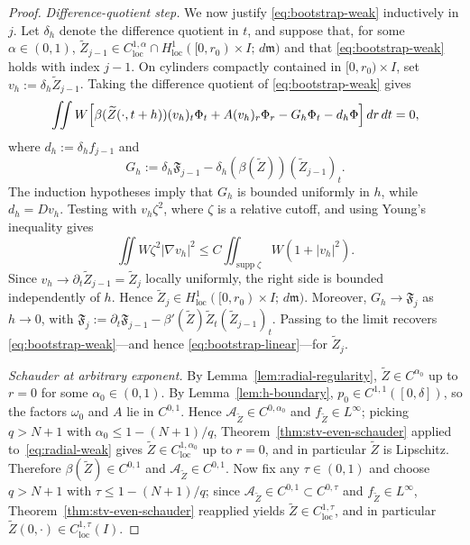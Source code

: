 \documentclass[11pt]{amsart}
\newcommand{\dd}{\,d}
\newcommand{\loc}{\mathrm{loc}}
\begin{document}
\begin{proof}
\emph{Difference-quotient step.} We now justify \eqref{eq:bootstrap-weak}
inductively in \(j\). Let \(\delta_h\) denote the difference quotient in
\(t\), and suppose that, for some \(\alpha\in(0,1)\),
\(\widetilde Z_{j-1}\in C^{1,\alpha}_{\loc}\cap H^1_{\loc}([0,r_0)\times I;\dd\mathfrak m)\)
and that \eqref{eq:bootstrap-weak} holds with index \(j-1\). On cylinders
compactly contained in \([0,r_0)\times I\), set
\(v_h:=\delta_h\widetilde Z_{j-1}\). Taking the difference quotient of
\eqref{eq:bootstrap-weak} gives
\[
        \iint W\Bigl[
        \beta(\widetilde Z(\cdot,t+h))(v_h)_t\Phi_t
        +A(v_h)_r\Phi_r-G_h\Phi_t-d_h\Phi
        \Bigr]\dd r\dd t=0,
\]
where \(d_h:=\delta_h f_{j-1}\) and
\[
        G_h:=\delta_h\mathfrak F_{j-1}
        -\delta_h(\beta(\widetilde Z))(\widetilde Z_{j-1})_t .
\]
The induction hypotheses imply that \(G_h\) is bounded uniformly in \(h\),
while \(d_h=Dv_h\). Testing with \(v_h\zeta^2\), where \(\zeta\) is a
relative cutoff, and using Young's inequality gives
\[
        \iint W\zeta^2|\nabla v_h|^2
        \le C\iint_{\operatorname{supp}\zeta}W(1+|v_h|^2).
\]
Since \(v_h\to\partial_t\widetilde Z_{j-1}=\widetilde Z_j\) locally uniformly, the right side is
bounded independently of \(h\). Hence
\(\widetilde Z_j\in H^1_{\loc}([0,r_0)\times I;\dd\mathfrak m)\).
Moreover, \(G_h\to\mathfrak F_j\) as \(h\to0\), with
\(\mathfrak F_j:=\partial_t\mathfrak F_{j-1}-\beta'(\widetilde Z)\widetilde Z_t(\widetilde Z_{j-1})_t\).
Passing to the limit recovers \eqref{eq:bootstrap-weak}---and hence
\eqref{eq:bootstrap-linear}---for \(\widetilde Z_j\).

\emph{Schauder at arbitrary exponent.} By
Lemma~\ref{lem:radial-regularity}, \(\widetilde Z\in C^{\alpha_0}\) up to \(r=0\)
for some \(\alpha_0\in(0,1)\). By Lemma~\ref{lem:h-boundary},
\(p_0\in C^{1,1}([0,\delta])\), so the factors \(\omega_0\) and
\(A\) lie in \(C^{0,1}\). Hence \(\mathcal A_{\widetilde Z}\in C^{0,\alpha_0}\) and
\(f_{\widetilde Z}\in L^\infty\); picking \(q>N+1\) with \(\alpha_0\le 1-(N+1)/q\),
Theorem~\ref{thm:stv-even-schauder} applied to~\eqref{eq:radial-weak}
gives \(\widetilde Z\in C^{1,\alpha_0}_{\loc}\) up to \(r=0\), and in particular \(\widetilde Z\)
is Lipschitz. Therefore \(\beta(\widetilde Z)\in C^{0,1}\) and
\(\mathcal A_{\widetilde Z}\in C^{0,1}\). Now fix any \(\tau\in(0,1)\) and choose
\(q>N+1\) with \(\tau\le 1-(N+1)/q\); since
\(\mathcal A_{\widetilde Z}\in C^{0,1}\subset C^{0,\tau}\) and \(f_{\widetilde Z}\in L^\infty\),
Theorem~\ref{thm:stv-even-schauder} reapplied yields
\(\widetilde Z\in C^{1,\tau}_{\loc}\), and in particular
\(\widetilde Z(0,\cdot)\in C^{1,\tau}_{\loc}(I)\).


\end{proof}
\end{document}
